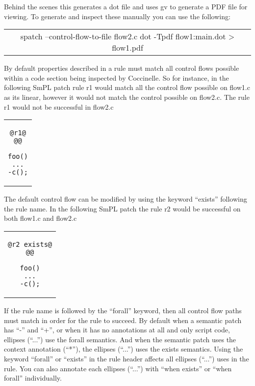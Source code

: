 
Behind the scenes this generates a dot file and uses gv to generate
a PDF file for viewing. To generate and inspect these manually you
can use the following:

\begin{center}
\begin{tabular}{c}
spatch --control-flow-to-file flow2.c
dot -Tpdf flow1:main.dot > flow1.pdf
\end{tabular}
\end{center}

By default properties described in a rule must match all control
flows possible within a code section being inspected by Coccinelle.
So for instance, in the following SmPL patch rule r1 would match all
the control flow possible on flow1.c as its linear, however it would
not match the control possible on flow2.c. The rule r1 would not
be successful in flow2.c

\begin{center}
\begin{tabular}{c}
\begin{lstlisting}[language=Cocci]
@r1@
@@

foo()
...
-c();

\end{lstlisting}\\
\end{tabular}
\end{center}

The default control flow can be modified by using the keyword ``exists''
following the rule name. In the following SmPL patch the rule r2 would
be successful on both flow1.c and flow2.c

\begin{center}
\begin{tabular}{c}
\begin{lstlisting}[language=Cocci]
@r2 exists@
@@

foo()
...
-c();

\end{lstlisting}\\
\end{tabular}
\end{center}

If the rule name is followed by the ``forall'' keyword, then all control flow
paths must match in order for the rule to succeed. By default when a
semantic patch has ``-'' and ``+'', or when it has no annotations at all and
only script code, ellipses (``...'') use the forall semantics.  And when the
semantic patch uses the context annotation (``*''), the ellipses (``...'') uses
the exists semantics.  Using the keyword ``forall'' or ``exists'' in the rule
header affects all ellipses (``...'') uses in the rule. You can also annotate
each ellipses (``...'') with ``when exists'' or ``when forall'' individually.

